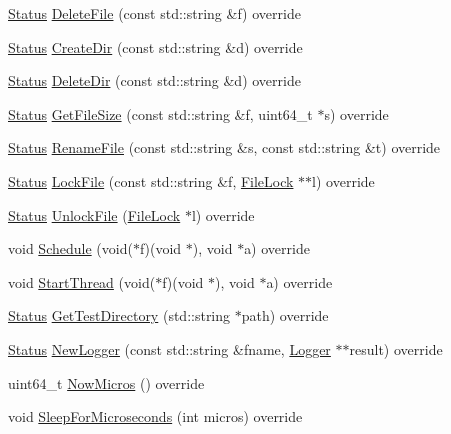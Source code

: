 \begin{DoxyCompactItemize}
\mbox{\hyperlink{classleveldb_1_1_status}{Status}} \mbox{\hyperlink{classleveldb_1_1_env_wrapper_ab409ec8ea8a969b007f6b939129f665a}{Delete\+File}} (const std\+::string \&f) override
\item 
\mbox{\hyperlink{classleveldb_1_1_status}{Status}} \mbox{\hyperlink{classleveldb_1_1_env_wrapper_a33a6d66b4d8791828e8b4e36ae3948a3}{Create\+Dir}} (const std\+::string \&d) override
\item 
\mbox{\hyperlink{classleveldb_1_1_status}{Status}} \mbox{\hyperlink{classleveldb_1_1_env_wrapper_a819f58dc05225852813c0b7440edd719}{Delete\+Dir}} (const std\+::string \&d) override
\item 
\mbox{\hyperlink{classleveldb_1_1_status}{Status}} \mbox{\hyperlink{classleveldb_1_1_env_wrapper_a012b279556e2d53fb819b537722b3158}{Get\+File\+Size}} (const std\+::string \&f, uint64\+\_\+t $\ast$s) override
\item 
\mbox{\hyperlink{classleveldb_1_1_status}{Status}} \mbox{\hyperlink{classleveldb_1_1_env_wrapper_a242f2f6f35bd043ba6905a49704d20c9}{Rename\+File}} (const std\+::string \&s, const std\+::string \&t) override
\item 
\mbox{\hyperlink{classleveldb_1_1_status}{Status}} \mbox{\hyperlink{classleveldb_1_1_env_wrapper_a1f571f5f4eef62ee5437991aeba52b71}{Lock\+File}} (const std\+::string \&f, \mbox{\hyperlink{classleveldb_1_1_file_lock}{File\+Lock}} $\ast$$\ast$l) override
\item 
\mbox{\hyperlink{classleveldb_1_1_status}{Status}} \mbox{\hyperlink{classleveldb_1_1_env_wrapper_ab83a07da23586f1b61e709b1512a2807}{Unlock\+File}} (\mbox{\hyperlink{classleveldb_1_1_file_lock}{File\+Lock}} $\ast$l) override
\item 
void \mbox{\hyperlink{classleveldb_1_1_env_wrapper_a69668ef703abeb29742870dfe437955b}{Schedule}} (void($\ast$f)(void $\ast$), void $\ast$a) override
\item 
void \mbox{\hyperlink{classleveldb_1_1_env_wrapper_a0e59526c61ba50f60e11480e7e7b44c0}{Start\+Thread}} (void($\ast$f)(void $\ast$), void $\ast$a) override
\item 
\mbox{\hyperlink{classleveldb_1_1_status}{Status}} \mbox{\hyperlink{classleveldb_1_1_env_wrapper_aee69c4d48bec60d40126ef66ef451476}{Get\+Test\+Directory}} (std\+::string $\ast$path) override
\item 
\mbox{\hyperlink{classleveldb_1_1_status}{Status}} \mbox{\hyperlink{classleveldb_1_1_env_wrapper_a5782db35fbf6e1a449b64f3aa43e174d}{New\+Logger}} (const std\+::string \&fname, \mbox{\hyperlink{classleveldb_1_1_logger}{Logger}} $\ast$$\ast$result) override
\item 
uint64\+\_\+t \mbox{\hyperlink{classleveldb_1_1_env_wrapper_ad037f3ac120367d5499e0c61e39785a3}{Now\+Micros}} () override
\item 
void \mbox{\hyperlink{classleveldb_1_1_env_wrapper_a2758834cf036084788c2504caebc5019}{Sleep\+For\+Microseconds}} (int micros) override
\end{DoxyCompactItemize}
